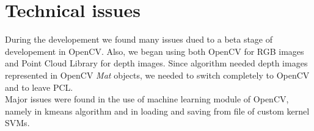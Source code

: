 \documentclass{article}
\begin{document}
\section{Technical issues}
During the developement we found many issues dued to a beta stage of
developement in OpenCV. Also, we began using both OpenCV for RGB images and
Point Cloud Library for depth images. Since algorithm \citep{Fanelli2011}
needed depth images represented in OpenCV \textit{Mat} objects, we needed to
switch completely to OpenCV and to leave PCL.
\\
Major issues were found in the use of machine learning module of OpenCV, namely
in kmeans algorithm and in loading and saving from file of custom kernel SVMs.

\printbibliography
\end{document}
